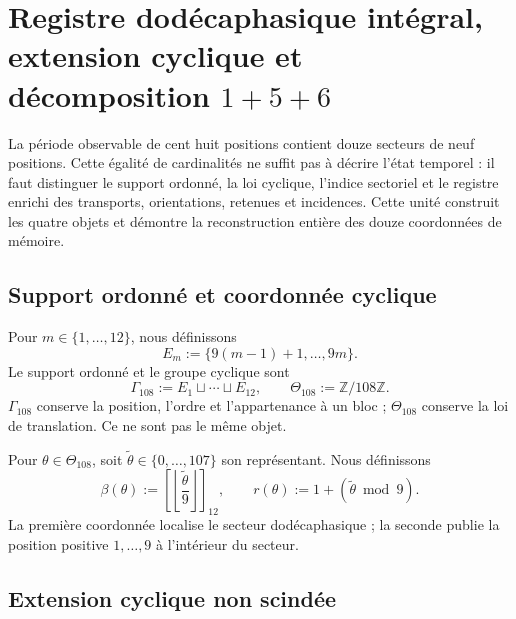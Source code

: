 
\chapter{Registre dodécaphasique intégral, extension cyclique et décomposition \(1+5+6\)}
\label{chap:registro-dodecafasico-integral}

La période observable de cent huit positions contient douze secteurs de
neuf positions. Cette égalité de cardinalités ne suffit pas à décrire
l’état temporel : il faut distinguer le support ordonné, la loi cyclique,
l’indice sectoriel et le registre enrichi des transports, orientations,
retenues et incidences. Cette unité construit les quatre objets et démontre
la reconstruction entière des douze coordonnées de mémoire.

\section{Support ordonné et coordonnée cyclique}

Pour \(m\in\{1,\ldots,12\}\), nous définissons
\begin{equation}
 E_m:=\{9(m-1)+1,\ldots,9m\}.
 \label{eq:u006d-bloques-nonadicos}
\end{equation}
Le support ordonné et le groupe cyclique sont
\begin{equation}
 \Gamma_{108}:=
 E_1\sqcup\cdots\sqcup E_{12},
 \qquad
 \Theta_{108}:=\mathbb Z/108\mathbb Z.
 \label{eq:u006d-gamma-theta}
\end{equation}
\(\Gamma_{108}\) conserve la position, l’ordre et l’appartenance à un bloc ;
\(\Theta_{108}\) conserve la loi de translation. Ce ne sont pas le même objet.

Pour \(\theta\in\Theta_{108}\), soit
\(\widetilde\theta\in\{0,\ldots,107\}\) son représentant. Nous définissons
\begin{equation}
 \beta(\theta):=
 \left[
 \left\lfloor\frac{\widetilde\theta}{9}\right\rfloor
 \right]_{12},
 \qquad
 r(\theta):=1+(\widetilde\theta\bmod9).
 \label{eq:u006d-coordenadas-bloque-residuo}
\end{equation}
La première coordonnée localise le secteur dodécaphasique ; la seconde publie
la position positive \(1,\ldots,9\) à l’intérieur du secteur.

\section{Extension cyclique non scindée}

